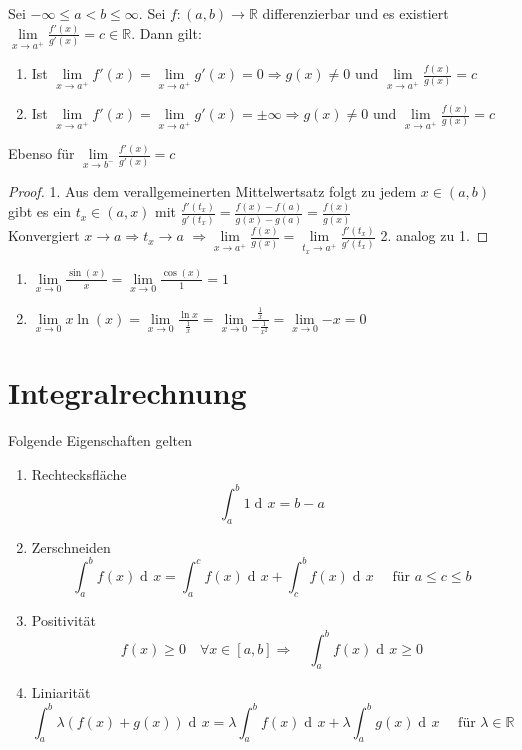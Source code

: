 \documentclass[a4paper,titlepage,oneside]{article}
\def\R{\ensuremath{\mathbb{R}} }
\newcommand{\der}{\operatorname{d\!}{}}
\def\fa{\ensuremath{\forall}}
\newcommand{\limnull}[2][n]{\ensuremath{\lim\limits_{#1 \rightarrow 0}{#2}}}
\newcommand{\limpos}[3][n]{\ensuremath{\lim\limits_{#1 \rightarrow #2^+}{#3}}}
\newcommand{\limneg}[3][n]{\ensuremath{\lim\limits_{#1 \rightarrow #2^-}{#3}}}
\newcommand{\integral}[4][x]{\ensuremath{\int_{#2}^{#3}{#4\der #1}}}
\newcommand{\intAB}[2][x]{\integral[#1]{a}{b}{#2}}
\theoremstyle{thmstyle}
\begin{document}
\begin{satz}
Sei $-\infty \le a < b \le \infty$. Sei $f : (a,b) \to \R $ differenzierbar und es existiert $\limpos[x]{a}{\frac{f'(x)}{g'(x)}} = c \in \R$.
Dann gilt:
\begin{enumerate}
\item Ist $\limpos[x]{a}{f'(x)} = \limpos[x]{a}{g'(x)} = 0 \Rightarrow g(x) \ne 0 \text{ und } \limpos[x]{a}{\frac{f(x)}{g(x)}} = c$
\item Ist $\limpos[x]{a}{f'(x)} = \limpos[x]{a}{g'(x)} = \pm \infty \Rightarrow g(x) \ne 0 \text{ und } \limpos[x]{a}{\frac{f(x)}{g(x)}} = c$
\end{enumerate}
Ebenso für $\limneg[x]{b}{\frac{f'(x)}{g'(x)}} = c$
\begin{proof}
1. Aus dem verallgemeinerten Mittelwertsatz folgt zu jedem $x \in (a,b)$ gibt es ein $t_x \in (a,x)$ mit $\frac{f'(t_x)}{g'(t_x)} = \frac{f(x) - f(a)}{g(x) - g(a)} = \frac{f(x)}{g(x)}$\\
Konvergiert $x \to a \Rightarrow  t_x \to a$
$\Rightarrow \limpos[x]{a}{\frac{f(x)}{g(x)}} = \limpos[t_x]{a}{\frac{f'(t_x)}{g'(t_x)}}$
2. analog zu 1.
\end{proof}
\end{satz}

\begin{bsp}
\begin{enumerate}
\item $ \limnull[x]{\frac{\sin(x)}{x}} = \limnull[x]{\frac{\cos(x)}{1}} = 1$
\item $ \limnull[x]{x \ln(x)} = \limnull[x]{\frac{\ln x}{\frac{1}{x}}} = \limnull[x]{\frac{\frac{1}{x}}{-\frac{1}{x^2}}} = \limnull[x]{-x} = 0$
\end{enumerate}
\end{bsp}

\newpage
\section{Integralrechnung}

Folgende Eigenschaften gelten
\begin{enumerate}
\item Rechtecksfläche \[  \intAB{1} = b - a\]
\item Zerschneiden \[  \intAB{f(x)} = \integral{a}{c}{f(x)} + \integral{c}{b}{f(x)} \quad \text{ für } a \le c \le b \]
\item Positivität \[ f(x) \ge 0 \quad \fa x \in [a,b] \Rightarrow \quad \intAB{f(x)} \ge 0\]
\item Liniarität \[\intAB{\lambda (f(x) + g(x))} = \lambda \intAB{f(x)} + \lambda \intAB{g(x)} \quad \text{ für } \lambda \in \R\]
\end{enumerate}
\end{document}
